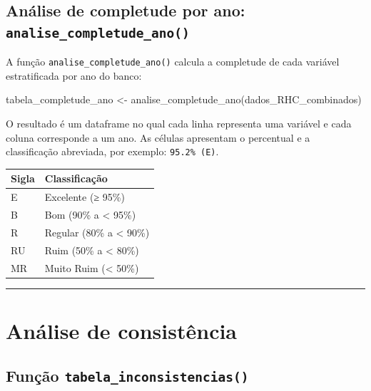 \documentclass[
  brazilian,
  a4paper,
  oneside]{scrbook}
\newenvironment{Shaded}{\begin{snugshade}}{\end{snugshade}}
\newcommand{\FunctionTok}[1]{\textcolor[rgb]{0.28,0.35,0.67}{#1}}
\newcommand{\NormalTok}[1]{\textcolor[rgb]{0.00,0.23,0.31}{#1}}
\newcommand{\OtherTok}[1]{\textcolor[rgb]{0.00,0.23,0.31}{#1}}
\newcounter{none} %
\begin{document}
\subsection{\texorpdfstring{Análise de completude por ano:
\texttt{analise\_completude\_ano()}}{Análise de completude por ano: analise\_completude\_ano()}}\label{anuxe1lise-de-completude-por-ano-analise_completude_ano}

A função \texttt{analise\_completude\_ano()} calcula a completude de
cada variável estratificada por ano do banco:

\begin{Shaded}
\begin{Highlighting}[]
\NormalTok{tabela\_completude\_ano }\OtherTok{\textless{}{-}} \FunctionTok{analise\_completude\_ano}\NormalTok{(dados\_RHC\_combinados)}
\end{Highlighting}
\end{Shaded}

O resultado é um dataframe no qual cada linha representa uma variável e
cada coluna corresponde a um ano. As células apresentam o percentual e a
classificação abreviada, por exemplo: \texttt{95.2\%\ (E)}.

{\def\LTcaptype{none} %
\begin{longtable}[]{@{}ll@{}}
\toprule\noalign{}
Sigla & Classificação \\
\midrule\noalign{}
\endhead
\bottomrule\noalign{}
\endlastfoot
E & Excelente (≥ 95\%) \\
B & Bom (90\% a \textless{} 95\%) \\
R & Regular (80\% a \textless{} 90\%) \\
RU & Ruim (50\% a \textless{} 80\%) \\
MR & Muito Ruim (\textless{} 50\%) \\
\end{longtable}
}

\begin{center}\rule{0.5\linewidth}{0.5pt}\end{center}

\section{Análise de consistência}\label{anuxe1lise-de-consistuxeancia}

\subsection{\texorpdfstring{Função
\texttt{tabela\_inconsistencias()}}{Função tabela\_inconsistencias()}}\label{funuxe7uxe3o-tabela_inconsistencias}
\end{document}
